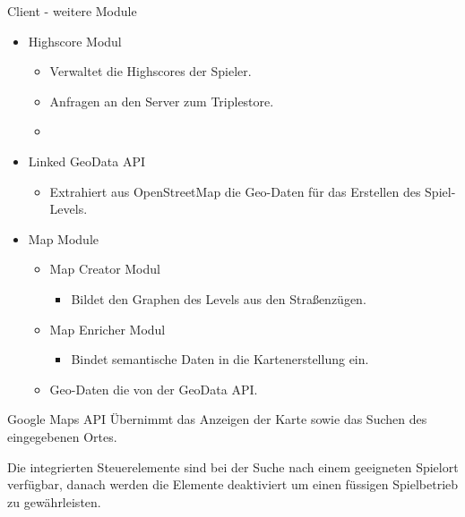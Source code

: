 \documentclass{beamer}
\begin{document}
\begin{frame}{Client - weitere Module}
\begin{itemize}
\item Highscore Modul
\begin{itemize}
\item Verwaltet die Highscores der Spieler.
\item Anfragen an den Server zum Triplestore.
\item 
\end{itemize}
\item Linked GeoData API
\begin{itemize}
\item Extrahiert aus OpenStreetMap die Geo-Daten für
das Erstellen des Spiel-Levels.
\end{itemize}
\item Map Module
\begin{itemize}
\item Map Creator Modul
\begin{itemize}
\item Bildet den Graphen des Levels aus den Straßenzügen.
\end{itemize}

\item Map Enricher Modul
\begin{itemize}
\item Bindet semantische Daten
in die Kartenerstellung ein.
\end{itemize}
\item Geo-Daten die von der GeoData API.
\end{itemize}
\end{itemize}

\end{frame}

\begin{frame}{Google Maps API}
Übernimmt das Anzeigen
der Karte sowie das Suchen des eingegebenen Ortes. \par\bigskip

Die integrierten Steuerelemente sind bei der Suche nach einem geeigneten
Spielort verfügbar, danach werden die Elemente deaktiviert um einen
füssigen Spielbetrieb zu gewährleisten.

\end{frame}
\end{document}
